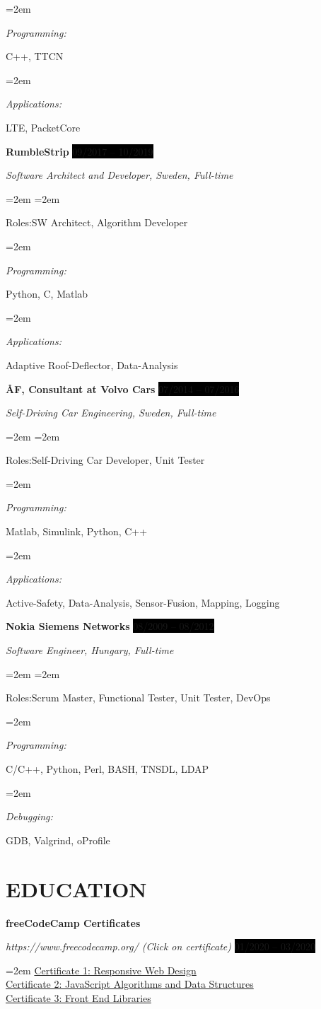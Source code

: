 \documentclass[paper=a4,fontsize=11pt]{scrartcl}	 			%
\newlength{\spacebox}
\newcommand{\sepspace}{\vspace*{1em}}			%
\newcommand{\NewPart}[1]{\section*{\uppercase{#1}}}
\newcommand{\PersonalEntry}[2]{
		\noindent\hangindent=2em\hangafter=0 		%
		\parbox{\spacebox}{						%
		\textit{#1}}								%
		\hspace{1.5em} #2 \par}					%
\newcommand{\SkillsEntry}[2]{						%
		\noindent\hangindent=2em\hangafter=0 		%
		\parbox{\spacebox}{						%
		\textit{#1}}								%
		\hspace{1.5em} #2 \par}					%
\newcommand{\EducationEntry}[4]{
		\noindent \textbf{#1} \par 					%
		\noindent \textit{#3} \hfill				%
		\colorbox{Black}{%
			\hfill\color{White}#2} \par				%
		\noindent\hangindent=2em\hangafter=0 \small #4 	%
		\normalsize \par
    }
\newcommand{\WorkEntry}[4]{					        %
		\noindent \textbf{#1} \hfill 				%
		\colorbox{Black}{\color{White}#2} \par		%
		\noindent \textit{#3} \par					%
		\noindent\hangindent=2em\hangafter=0 \small #4 	%
		\normalsize \par}
\begin{document}
\SkillsEntry{Programming:}{C++, TTCN}

\SkillsEntry{Applications:}{LTE, PacketCore}


\sepspace

\WorkEntry{RumbleStrip}{09/2017 -- 10/2019}{Software Architect and Developer, Sweden, Full-time}

\SkillsEntry{Roles:}{SW Architect, Algorithm Developer}

\SkillsEntry{Programming:}{Python, C, Matlab}

\SkillsEntry{Applications:}{Adaptive Roof-Deflector, Data-Analysis}


\sepspace

\WorkEntry{ÅF, Consultant at Volvo Cars}{07/2014 -- 07/2016}{Self-Driving Car Engineering, Sweden, Full-time}

\SkillsEntry{Roles:}{Self-Driving Car Developer, Unit Tester}

\SkillsEntry{Programming:}{Matlab, Simulink, Python, C++}

\SkillsEntry{Applications:}{Active-Safety, Data-Analysis, Sensor-Fusion, Mapping, Logging}


\sepspace

\WorkEntry{Nokia Siemens Networks}{08/2009 -- 08/2012}{Software Engineer, Hungary, Full-time}

\SkillsEntry{Roles:}{Scrum Master, Functional Tester, Unit Tester, DevOps}

\SkillsEntry{Programming:}{C/C++, Python, Perl, BASH, TNSDL, LDAP}


\SkillsEntry{Debugging:}{GDB, Valgrind, oProfile}


\clearpage

\NewPart{Education}{}

\EducationEntry{freeCodeCamp Certificates}{01/2020 -- 03/2020}
{https://www.freecodecamp.org/ (Click on certificate)}
{\href{https://www.freecodecamp.org/certification/fcc7d8027bd-7ee4-4ec3-816b-87c5087dab3c/responsive-web-design}{Certificate 1: Responsive Web Design} \\
 \href{https://www.freecodecamp.org/certification/fcc7d8027bd-7ee4-4ec3-816b-87c5087dab3c/javascript-algorithms-and-data-structures}{Certificate 2: JavaScript Algorithms and Data Structures} \\
 \href{https://www.freecodecamp.org/certification/fcc7d8027bd-7ee4-4ec3-816b-87c5087dab3c/front-end-libraries}{Certificate 3: Front End Libraries}
}
\end{document}
